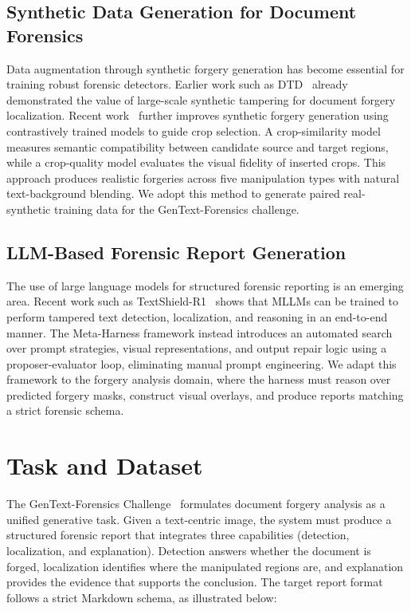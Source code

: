 \documentclass[sigconf, screen, review, anonymous]{acmart}
\begin{document}
\subsection{Synthetic Data Generation for Document Forensics}

Data augmentation through synthetic forgery generation has become essential for training robust forensic detectors. Earlier work such as DTD~\cite{qu2023towards} already demonstrated the value of large-scale synthetic tampering for document forgery localization. Recent work~\cite{dhouib2025leveraging} further improves synthetic forgery generation using contrastively trained models to guide crop selection. A crop-similarity model measures semantic compatibility between candidate source and target regions, while a crop-quality model evaluates the visual fidelity of inserted crops. This approach produces realistic forgeries across five manipulation types with natural text-background blending. We adopt this method to generate paired real-synthetic training data for the GenText-Forensics challenge.

\subsection{LLM-Based Forensic Report Generation}

The use of large language models for structured forensic reporting is an emerging area. Recent work such as TextShield-R1~\cite{qu2026textshield} shows that MLLMs can be trained to perform tampered text detection, localization, and reasoning in an end-to-end manner. The Meta-Harness framework \cite{meta2025harness} instead introduces an automated search over prompt strategies, visual representations, and output repair logic using a proposer-evaluator loop, eliminating manual prompt engineering. We adapt this framework to the forgery analysis domain, where the harness must reason over predicted forgery masks, construct visual overlays, and produce reports matching a strict forensic schema.

\section{Task and Dataset}
\label{sec:task}

The GenText-Forensics Challenge~\cite{gentext2026} formulates document forgery analysis as a unified generative task. Given a text-centric image, the system must produce a structured forensic report that integrates three capabilities (detection, localization, and explanation). Detection answers whether the document is forged, localization identifies where the manipulated regions are, and explanation provides the evidence that supports the conclusion. The target report format follows a strict Markdown schema, as illustrated below:
\end{document}
